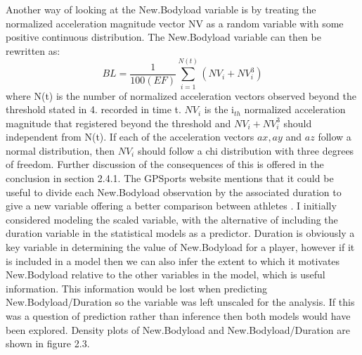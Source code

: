 \hfill\break
\newline
Another way of looking at the New.Bodyload variable is by treating the normalized acceleration magnitude vector NV as a random variable with some positive continuous distribution. The New.Bodyload variable can then be rewritten as: \[BL=\frac{1}{100(EF)}\sum_{i=1}^{N(t)} {(NV_i+NV_i^3)} \]
where N(t) is the number of normalized acceleration vectors observed beyond the threshold stated in 4. recorded in time t. $NV_i$ is the i$_{th}$ normalized acceleration magnitude that registered beyond the threshold and $NV_i + NV_i^3$ should independent from N(t). If each of the acceleration vectors $ax,ay$ and $az$ follow a normal distribution, then $NV_i$ should follow a chi distribution with three degrees of freedom. Further discussion of the consequences of this is offered in the conclusion in section 2.4.1.
\hfill\break
\newline
The GPSports website mentions that it could be useful to divide each New.Bodyload observation by the associated duration to give a new variable offering a better comparison between athletes \cite{GPSportsVariables}. I initially considered modeling the scaled variable, with the alternative of including the duration variable in the statistical models as a predictor. Duration is obviously a key variable in determining the value of New.Bodyload for a player, however if it is included in a model then we can also infer the extent to which it motivates New.Bodyload relative to the other variables in the model, which is useful information. This information would be lost when predicting New.Bodyload/Duration so the variable was left unscaled for the analysis. If this was a question of prediction rather than inference then both models would have been explored. Density plots of New.Bodyload and New.Bodyload/Duration are shown in figure 2.3.

